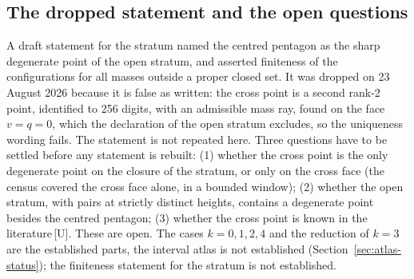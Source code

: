 \documentclass[11pt]{article}
\theoremstyle{definition}
\theoremstyle{remark}
\newcommand{\mk}[1]{\,{\scriptsize[#1]}}
\newcommand{\Um}{\mk{U}}
\begin{document}
\subsection{The dropped statement and the open questions}

A draft statement for the stratum named the centred pentagon as the sharp degenerate point of the open stratum, and asserted
finiteness of the configurations for all masses outside a proper closed set. It was dropped on 23 August 2026 because it is false
as written: the cross point is a second rank-2 point, identified to 256 digits, with an admissible mass ray, found on the face $v=q=0$, which the
declaration of the open stratum excludes, so the uniqueness wording fails. The statement is not repeated here.
Three questions have to be settled before any statement is rebuilt:
(1) whether the cross point is the only degenerate point on the closure of the stratum, or only on the cross face (the census
covered the cross face alone, in a bounded window);
(2) whether the open stratum, with pairs at strictly distinct heights, contains a degenerate point besides the centred pentagon;
(3) whether the cross point is known in the literature\Um.
These are open. The cases $k=0,1,2,4$ and the reduction of $k=3$ are the established parts, the interval atlas is not established (Section~\ref{sec:atlas-status}); the finiteness statement
for the stratum is not established.
\end{document}
